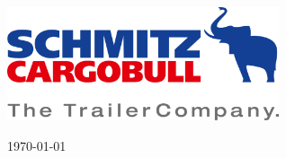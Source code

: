 \begin{titlepage}
\begin{minipage}[t]{9cm}
\begin{tabular}{ll}
		\end{tabular}
	\end{minipage}

	\vspace{7cm}

	\begin{flushleft}
	\centering \hspace{0cm}
	\begin{minipage}[t]{8cm}
			\vspace{-5cm}
			\includegraphics[width=8cm]{./pic/firmenlogo.jpg}
	\end{minipage}
	\end{flushleft}


	\centering %
	\begin{minipage}[b]{5cm}
			\centering
			\today\\ %
	\end{minipage}

	\restoregeometry
\end{titlepage}

